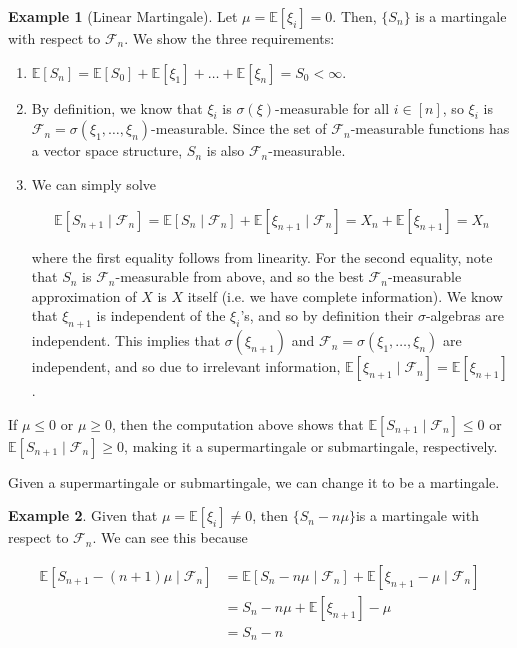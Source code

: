 \documentclass{article}
\theoremstyle{definition}
\newtheorem{example}{Example}[section]
\theoremstyle{remark}
\theoremstyle{definition}
\begin{document}
  \begin{example}[Linear Martingale]
    Let $\mu = \mathbb{E}[\xi_i] = 0$. Then, $\{S_n\}$ is a martingale with respect to $\mathcal{F}_n$. We show the three requirements: 
    \begin{enumerate}
      \item $\mathbb{E}[S_n] = \mathbb{E}[S_0] + \mathbb{E}[\xi_1] + \ldots + \mathbb{E}[\xi_n] = S_0 < \infty$. 
      
      \item By definition, we know that $\xi_i$ is $\sigma(\xi)$-measurable for all $i \in [n]$, so $\xi_i$ is $\mathcal{F}_n = \sigma(\xi_1, \ldots, \xi_n)$-measurable. Since the set of $\mathcal{F}_n$-measurable functions has a vector space structure, $S_n$ is also $\mathcal{F}_n$-measurable. 
      
      \item We can simply solve 

        \[\mathbb{E}[S_{n+1} \mid \mathcal{F}_n] = \mathbb{E}[S_n \mid \mathcal{F}_n] + \mathbb{E}[\xi_{n+1} \mid \mathcal{F}_n] = X_n + \mathbb{E}[\xi_{n+1}] = X_n\]

      where the first equality follows from linearity. For the second equality, note that $S_n$ is $\mathcal{F}_n$-measurable from above, and so the best $\mathcal{F}_n$-measurable approximation of $X$ is $X$ itself (i.e. we have complete information). We know that $\xi_{n+1}$ is independent of the $\xi_i$'s, and so by definition their $\sigma$-algebras are independent. This implies that $\sigma(\xi_{n+1})$ and $\mathcal{F}_n = \sigma(\xi_1, \ldots, \xi_n)$ are independent, and so due to irrelevant information, $\mathbb{E}[\xi_{n+1} \mid \mathcal{F}_n] = \mathbb{E}[\xi_{n+1}]$. 
    \end{enumerate}
    If $\mu \leq 0$ or $\mu \geq 0$, then the computation above shows that $\mathbb{E}[S_{n+1} \mid \mathcal{F}_n] \leq 0$ or $\mathbb{E}[S_{n+1} \mid \mathcal{F}_n] \geq 0$, making it a supermartingale or submartingale, respectively. 
  \end{example}

  Given a supermartingale or submartingale, we can change it to be a martingale. 

  \begin{example}
  Given that $\mu = \mathbb{E}[\xi_i] \neq 0$, then $\{S_n - n\mu\}$is a martingale with respect to $\mathcal{F}_n$. We can see this because

  \begin{align*}
    \mathbb{E}[S_{n+1} - (n + 1)\mu \mid \mathcal{F}_n] & = \mathbb{E}[S_n - n \mu \mid \mathcal{F}_n] + \mathbb{E}[\xi_{n+1} - \mu \mid \mathcal{F}_n] \\
    & = S_n - n \mu + \mathbb{E}[\xi_{n+1}] - \mu \\
    & = S_n - n
  \end{align*}
  \end{example}
\end{document}
